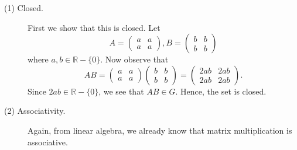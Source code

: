 \documentclass[12pt,letterpaper]{algebra_book}
\theoremstyle{definition}
\begin{document}
    \begin{description}
        \item[(1) Closed.] First we show that this is closed. Let 
        \[
            A = \begin{pmatrix}
                a & a\\
                a & a
            \end{pmatrix}, 
            B = 
            \begin{pmatrix}
                b & b\\
                b & b
            \end{pmatrix}
        \] 
        where $a, b \in \mathbb{R}-\{0\}$. Now observe that 
        \[
            AB = 
            \begin{pmatrix}
                a & a\\
                a & a
            \end{pmatrix}
            \begin{pmatrix}
                b & b\\
                b & b
            \end{pmatrix}
            = 
            \begin{pmatrix}
                2ab & 2ab\\
                2ab & 2ab
            \end{pmatrix}.
        \]
        Since $2ab \in \mathbb{R}-\{0\}$, we see that $AB \in G$.
        Hence, the set is closed.

        \item[(2) Associativity.] Again, from linear algebra, we
        already know that matrix multiplication is associative.


\end{description}
\end{document}
